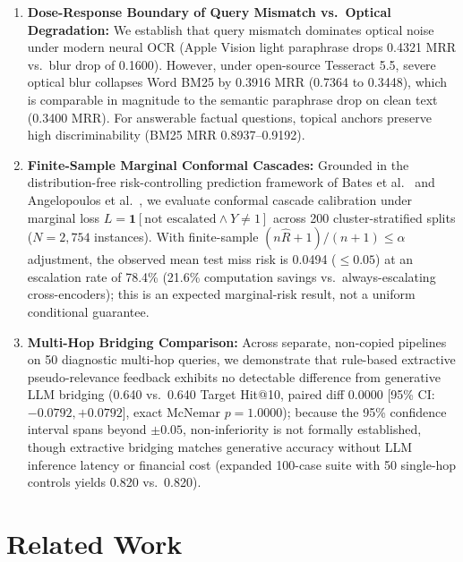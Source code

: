 \documentclass[conference]{IEEEtran}
\begin{document}
\begin{enumerate}
    \item \textbf{Dose-Response Boundary of Query Mismatch vs.\ Optical Degradation:} We establish that query mismatch dominates optical noise under modern neural OCR (Apple Vision light paraphrase drops 0.4321 MRR vs.\ blur drop of 0.1600). However, under open-source Tesseract 5.5, severe optical blur collapses Word BM25 by 0.3916 MRR (0.7364 to 0.3448), which is comparable in magnitude to the semantic paraphrase drop on clean text (0.3400 MRR). For answerable factual questions, topical anchors preserve high discriminability (BM25 MRR 0.8937--0.9192).
    \item \textbf{Finite-Sample Marginal Conformal Cascades:} Grounded in the distribution-free risk-controlling prediction framework of Bates et al.~\cite{bates2021conformal} and Angelopoulos et al.~\cite{angelopoulos2021gentle}, we evaluate conformal cascade calibration under marginal loss $L = \mathbf{1}[\text{not escalated} \land Y \ne 1]$ across 200 cluster-stratified splits ($N=2{,}754$ instances). With finite-sample $(n\hat{R}+1)/(n+1) \le \alpha$ adjustment, the observed mean test miss risk is 0.0494 ($\le 0.05$) at an escalation rate of 78.4\% (21.6\% computation savings vs.\ always-escalating cross-encoders); this is an expected marginal-risk result, not a uniform conditional guarantee.
    \item \textbf{Multi-Hop Bridging Comparison:} Across separate, non-copied pipelines on 50 diagnostic multi-hop queries, we demonstrate that rule-based extractive pseudo-relevance feedback exhibits no detectable difference from generative LLM bridging (0.640 vs.\ 0.640 Target Hit@10, paired diff $0.0000$ [95\% CI: $-0.0792, +0.0792$], exact McNemar $p = 1.0000$); because the 95\% confidence interval spans beyond $\pm 0.05$, non-inferiority is not formally established, though extractive bridging matches generative accuracy without LLM inference latency or financial cost (expanded 100-case suite with 50 single-hop controls yields 0.820 vs.\ 0.820).
\end{enumerate}

\section{Related Work}
\end{document}
